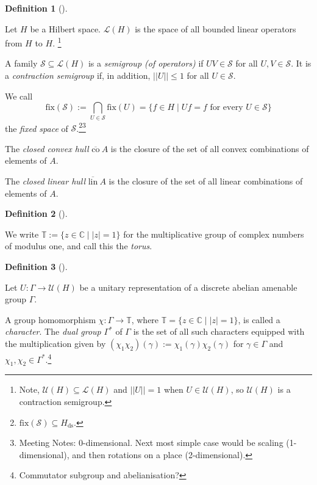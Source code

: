\documentclass[
  british,
]{article}
\theoremstyle{definition}
\theoremstyle{definition}
\newtheorem{definition}{Definition}[section]
\theoremstyle{plain}
\theoremstyle{remark}
\newcommand{\AmenableGroup}{{\Gamma}}
\newcommand{\AmenableGroupElement}{{\gamma}}
\newcommand{\Dual}[1]{{#1}^{*}}
\newcommand{\HilbertSpace}{{H}}
\newcommand{\Torus}{{\mathbb{T}}}
\begin{document}
\begin{definition}[]\protect\hypertarget{def-ContractionSemigroup}{}\label{def-ContractionSemigroup}

Let \(\HilbertSpace\) be a Hilbert space. \(\mathscr{L}(\HilbertSpace)\)
is the space of all bounded linear operators from \(\HilbertSpace\) to
\(\HilbertSpace\). \footnote{Note,
  \(\mathscr{U}(\HilbertSpace)\subseteq\mathscr{L}(\HilbertSpace)\) and
  \(||U||=1\) when \(U\in\mathscr{U}(\HilbertSpace)\), so
  \(\mathscr{U}(\HilbertSpace)\) is a contraction semigroup.}

A family \(\mathscr{S}\subseteq\mathscr{L}(\HilbertSpace)\) is a
\emph{semigroup (of operators)} if \(UV\in\mathscr{S}\) for all
\(U,V\in\mathscr{S}\). It is a \emph{contraction semigroup} if, in
addition, \(||U||\leq1\) for all \(U\in\mathscr{S}\).

We call
\[\text{fix}(\mathscr{S}):=\bigcap_{U\in\mathscr{S}}\text{fix}(U)=\{f\in\HilbertSpace\mid Uf=f\text{ for every }U\in\mathscr{S}\}\]
the \emph{fixed space} of \(\mathscr{S}\).\footnote{\(\text{fix}(\mathscr{S})\subseteq \HilbertSpace_\text{ds}\).}\footnote{Meeting
  Notes: 0-dimensional. Next most simple case would be scaling
  (1-dimensional), and then rotations on a place (2-dimensional).}

The \emph{closed convex hull} \(\overline{\text{co}}\ A\) is the closure
of the set of all convex combinations of elements of \(A\).

The \emph{closed linear hull} \(\overline{\text{lin}}\ A\) is the
closure of the set of all linear combinations of elements of \(A\).

\end{definition}

\begin{definition}[]\protect\hypertarget{def-Torus}{}\label{def-Torus}

We write \(\Torus:=\{z\in\mathbb{C}\mid |z|=1\}\) for the multiplicative
group of complex numbers of modulus one, and call this the \emph{torus}.

\end{definition}

\begin{definition}[]\protect\hypertarget{def-DualGroup}{}\label{def-DualGroup}

Let \(U:\AmenableGroup\rightarrow\mathscr{U}(\HilbertSpace)\) be a
unitary representation of a discrete abelian amenable group
\(\AmenableGroup\).

A group homomorphism \(\chi:\AmenableGroup\rightarrow\Torus\), where
\(\mathbb{T}=\{z\in\mathbb{C}\mid|z|=1\}\), is called a
\emph{character}. The \emph{dual group} \(\Dual{\AmenableGroup}\) of
\(\AmenableGroup\) is the set of all such characters equipped with the
multiplication given by
\((\chi_1\chi_2)(\AmenableGroupElement):=\chi_1(\AmenableGroupElement)\chi_2(\AmenableGroupElement)\)
for \(\AmenableGroupElement\in\AmenableGroup\) and
\(\chi_1,\chi_2\in\Dual{\AmenableGroup}\).\footnote{Commutator subgroup
  and abelianisation?}

\end{definition}
\end{document}
